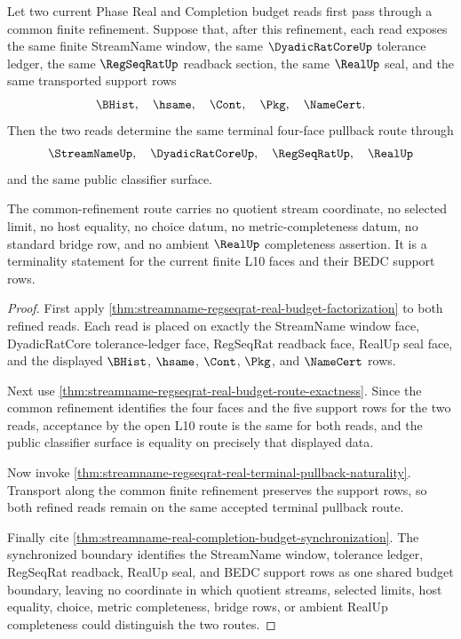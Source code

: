 \begin{theorem}
\label{thm:streamname-regseqrat-real-terminal-four-face-pullback}
Let two current Phase Real and Completion budget reads first pass through a common finite refinement. Suppose that, after this refinement, each read exposes the same finite StreamName window, the same $\DyadicRatCoreUp$ tolerance ledger, the same $\RegSeqRatUp$ readback section, the same $\RealUp$ seal, and the same transported support rows
$$
\BHist,\quad \hsame,\quad \Cont,\quad \Pkg,\quad \NameCert.
$$
Then the two reads determine the same terminal four-face pullback route through
$$
\StreamNameUp,\quad \DyadicRatCoreUp,\quad \RegSeqRatUp,\quad \RealUp
$$
and the same public classifier surface.

The common-refinement route carries no quotient stream coordinate, no selected limit, no host equality, no choice datum, no metric-completeness datum, no standard bridge row, and no ambient $\RealUp$ completeness assertion. It is a terminality statement for the current finite L10 faces and their BEDC support rows.
\end{theorem}
\begin{proof}
First apply \autoref{thm:streamname-regseqrat-real-budget-factorization} to both refined reads. Each read is placed on exactly the StreamName window face, DyadicRatCore tolerance-ledger face, RegSeqRat readback face, RealUp seal face, and the displayed $\BHist$, $\hsame$, $\Cont$, $\Pkg$, and $\NameCert$ rows.

Next use \autoref{thm:streamname-regseqrat-real-budget-route-exactness}. Since the common refinement identifies the four faces and the five support rows for the two reads, acceptance by the open L10 route is the same for both reads, and the public classifier surface is equality on precisely that displayed data.

Now invoke \autoref{thm:streamname-regseqrat-real-terminal-pullback-naturality}. Transport along the common finite refinement preserves the support rows, so both refined reads remain on the same accepted terminal pullback route.

Finally cite \autoref{thm:streamname-real-completion-budget-synchronization}. The synchronized boundary identifies the StreamName window, tolerance ledger, RegSeqRat readback, RealUp seal, and BEDC support rows as one shared budget boundary, leaving no coordinate in which quotient streams, selected limits, host equality, choice, metric completeness, bridge rows, or ambient RealUp completeness could distinguish the two routes.
\end{proof}
